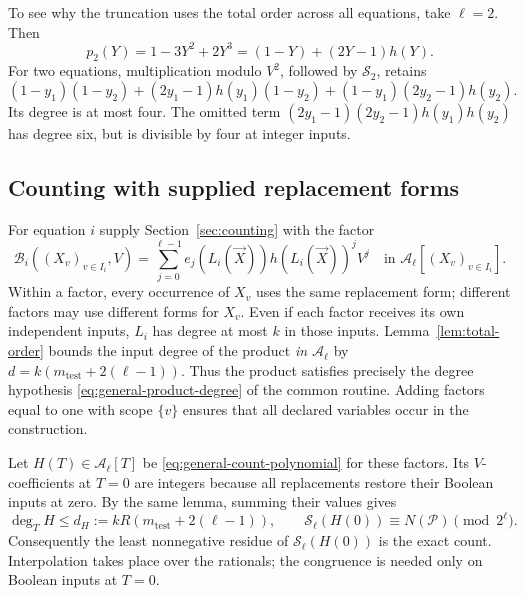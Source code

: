 \documentclass[11pt,reqno]{amsart}
\numberwithin{equation}{section}
\theoremstyle{definition}\newtheorem{definition}[theorem]{Definition}
\theoremstyle{remark}\newtheorem{remark}[theorem]{Remark}
\renewcommand{\le}{\leqslant}
\begin{document}
To see why the truncation uses the total order across all equations,
take $\ell=2$. Then
\[
 p_2(Y)=1-3Y^2+2Y^3=(1-Y)+(2Y-1)h(Y).
\]
For two equations, multiplication modulo $V^2$, followed by
$\mathcal S_2$, retains
\[
 (1-y_1)(1-y_2)
 +(2y_1-1)h(y_1)(1-y_2)
 +(1-y_1)(2y_2-1)h(y_2).
\]
Its degree is at most four. The omitted term
$(2y_1-1)(2y_2-1)h(y_1)h(y_2)$ has degree six, but is divisible
by four at integer inputs.

\subsection{Counting with supplied replacement forms}\label{subsec:count-polynomial}
For equation $i$ supply Section~\ref{sec:counting} with the factor
\begin{equation}\label{eq:lifted-factor}
 \mathcal B_i((X_v)_{v\in I_i},V)
 =\sum_{j=0}^{\ell-1}e_j(L_i(\vec X))h(L_i(\vec X))^j V^j
 \quad\text{in }\mathcal A_\ell[(X_v)_{v\in I_i}].
\end{equation}
Within a factor, every occurrence of $X_v$ uses the same replacement
form; different factors may use different forms for $X_v$. Even if
each factor receives its own independent inputs, $L_i$ has degree at
most $k$ in those inputs. Lemma~\ref{lem:total-order} bounds the input
degree of the product \emph{in $\mathcal A_\ell$} by
$d=k(m_{\mathrm{test}}+2(\ell-1))$. Thus the product satisfies precisely
the degree hypothesis \eqref{eq:general-product-degree} of the common
routine. Adding factors equal to one with scope $\{v\}$ ensures that
all declared variables occur in the construction.

Let $H(T)\in\mathcal A_\ell[T]$ be \eqref{eq:general-count-polynomial}
for these factors. Its $V$-coefficients at $T=0$ are integers because
all replacements restore their Boolean inputs at zero. By the same
lemma, summing their values gives
\begin{equation}\label{eq:origin-residue}
 \deg_T H\le d_H:=kR(m_{\mathrm{test}}+2(\ell-1)),\qquad
 \mathcal S_\ell(H(0))\equiv N(\mathcal P)\pmod{2^\ell}.
\end{equation}
Consequently the least nonnegative residue of $\mathcal S_\ell(H(0))$
is the exact count. Interpolation takes place over the rationals;
the congruence is needed only on Boolean inputs at $T=0$.
\end{document}
